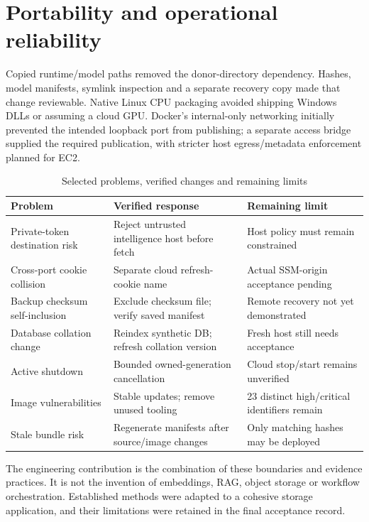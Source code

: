 \documentclass[11pt,a4paper,oneside]{report}
\begin{document}
\section{Portability and operational reliability}
Copied runtime/model paths removed the donor-directory dependency. Hashes, model manifests, symlink inspection and a separate recovery copy made that change reviewable. Native Linux CPU packaging avoided shipping Windows DLLs or assuming a cloud GPU. Docker's internal-only networking initially prevented the intended loopback port from publishing; a separate access bridge supplied the required publication, with stricter host egress/metadata enforcement planned for EC2.
\par\begin{table}[htbp]\caption{Selected problems, verified changes and remaining limits}\small\begin{tabularx}{\linewidth}{p{.25\linewidth}YY}\toprule Problem&Verified response&Remaining limit\\\midrule
Private-token destination risk&Reject untrusted intelligence host before fetch&Host policy must remain constrained\\
Cross-port cookie collision&Separate cloud refresh-cookie name&Actual SSM-origin acceptance pending\\
Backup checksum self-inclusion&Exclude checksum file; verify saved manifest&Remote recovery not yet demonstrated\\
Database collation change&Reindex synthetic DB; refresh collation version&Fresh host still needs acceptance\\
Active shutdown&Bounded owned-generation cancellation&Cloud stop/start remains unverified\\
Image vulnerabilities&Stable updates; remove unused tooling&23 distinct high/critical identifiers remain\\
Stale bundle risk&Regenerate manifests after source/image changes&Only matching hashes may be deployed\\\bottomrule\end{tabularx}\end{table}\par
The engineering contribution is the combination of these boundaries and evidence practices. It is not the invention of embeddings, RAG, object storage or workflow orchestration. Established methods were adapted to a cohesive storage application, and their limitations were retained in the final acceptance record.
\FloatBarrier
\end{document}
